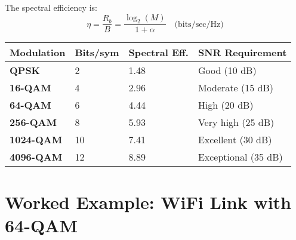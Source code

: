 The spectral efficiency is:
\begin{equation}
\eta = \frac{R_b}{B} = \frac{\log_2(M)}{1 + \alpha} \quad \text{(bits/sec/Hz)}
\label{eq:qam-spectral-efficiency}
\end{equation}

{\def\LTcaptype{} %
\begin{longtable}[]{@{}llll@{}}
\toprule\noalign{}
Modulation & Bits/sym & Spectral Eff. & SNR Requirement \\
\midrule\noalign{}
\endhead
\bottomrule\noalign{}
\endlastfoot
\textbf{QPSK} & 2 & 1.48 & Good (10 dB) \\
\textbf{16-QAM} & 4 & 2.96 & Moderate (15 dB) \\
\textbf{64-QAM} & 6 & 4.44 & High (20 dB) \\
\textbf{256-QAM} & 8 & 5.93 & Very high (25 dB) \\
\textbf{1024-QAM} & 10 & 7.41 & Excellent (30 dB) \\
\textbf{4096-QAM} & 12 & 8.89 & Exceptional (35 dB) \\
\end{longtable}
}

\section{Worked Example: WiFi Link with 64-QAM}

